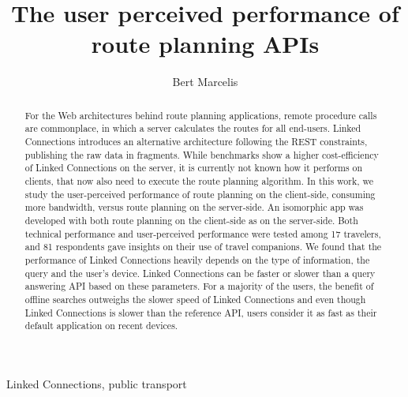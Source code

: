 \documentclass[twocolumn]{phdsymp} %
\begin{document}
\title{The user perceived performance of route planning APIs} %

\author{Bert Marcelis}


\maketitle

\begin{abstract}
For the Web architectures behind route planning applications, remote procedure calls are commonplace, in which a server calculates the routes for all end-users. Linked Connections introduces an alternative architecture following the REST constraints, publishing the raw data in fragments. While benchmarks show a higher cost-efficiency of Linked Connections on the server, it is currently not known how it performs on clients, that now also need to execute the route planning algorithm. In this work, we study the user-perceived performance of route planning on the client-side, consuming more bandwidth, versus route planning on the server-side. An isomorphic app was developed with both route planning on the client-side as on the server-side. Both technical performance and user-perceived performance were tested among 17 travelers, and 81 respondents gave insights on their use of travel companions.
We found that the performance of Linked Connections heavily depends on the type of information, the query and the user’s device. Linked Connections can be faster or slower than a query answering API based on these parameters. For a majority of the users, the benefit of offline searches outweighs the slower speed of Linked Connections and even though Linked Connections is slower than the reference API, users consider it as fast as their default application on recent devices.


\end{abstract}

\begin{keywords}
Linked Connections, public transport
\end{keywords}
\end{document}
